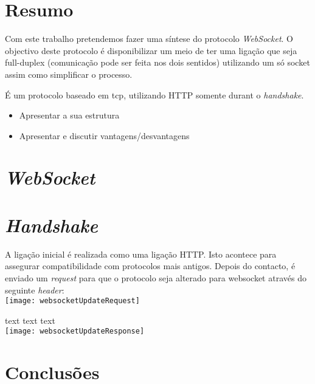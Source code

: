 \documentclass[a4paper]{article}
\begin{document}
\newpage
\setcounter{page}{1} %

\section{Resumo}

Com este trabalho pretendemos fazer uma síntese do protocolo \emph{WebSocket}. O objectivo deste protocolo é disponibilizar um meio de ter uma ligação que seja full-duplex (comunicação pode ser feita nos dois sentidos) utilizando um só socket assim como simplificar o processo.

É um protocolo baseado em tcp, utilizando HTTP somente durant o \emph{handshake}.

\begin{itemize}
\item Apresentar a sua estrutura
\item Apresentar e discutir vantagens/desvantagens
\end{itemize}

\newpage

\section{\emph{WebSocket} }

\section{\emph{Handshake}}
\textsf{A ligação inicial é realizada como uma ligação HTTP. Isto acontece para assegurar compatibilidade com protocolos mais antigos. Depois do contacto, é enviado um \emph{request} para que o protocolo seja alterado para websocket através do seguinte \emph{header}:}\\[0.5cm]

\texttt{[image: websocketUpdateRequest]}

\textsf{text text text}\\[0.5cm]

\texttt{[image: websocketUpdateResponse]}


\newpage
\section{Conclusões}
\end{document}

